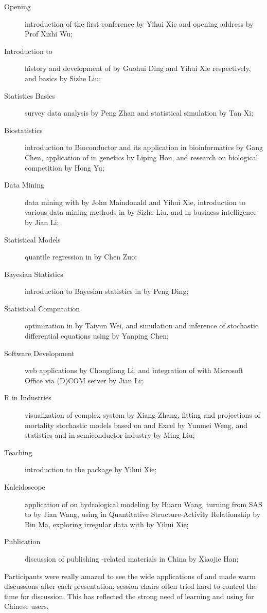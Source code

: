 \begin{description}
  \item[Opening] introduction of the first \R{} conference by Yihui
  Xie and opening address by Prof Xizhi Wu;
  \item[Introduction to \R{}] history and development of \R{} by Guohui Ding
  and Yihui Xie respectively, and \R{} basics by Sizhe Liu;
  \item[Statistics Basics] survey data analysis by Peng Zhan and
  statistical simulation by Tan Xi;
  \item[Biostatistics] introduction to Bioconductor and its application in bioinformatics
  by Gang Chen, application of \R{} in genetics by Liping Hou, and research on biological
  competition by Hong Yu;
  \item[Data Mining] data mining with \R{} by John Maindonald and
  Yihui Xie, introduction to various data mining methods in \R{} by
  Sizhe Liu, and \R{} in business intelligence by Jian Li;
  \item[Statistical Models] quantile regression in \R{} by Chen Zuo;
  \item[Bayesian Statistics] introduction to Bayesian statistics in
  \R{} by Peng Ding;
  \item[Statistical Computation] optimization in \R{} by Taiyun Wei,
  and simulation and inference of stochastic differential equations
  using \R{} by Yanping Chen;
  \item[Software Development] \R{} web applications by Chongliang
  Li, and integration of \R{} with Microsoft Office via \R{} (D)COM
  server by Jian Li;
  \item[R in Industries] visualization of complex system by Xiang
  Zhang, fitting and projections of mortality stochastic models
  based on \R{} and Excel by Yunmei Weng, and
  statistics and \R{} in semiconductor industry by Ming Liu;
  \item[Teaching] introduction to the \R{} package 
  by Yihui Xie;
  \item[Kaleidoscope] application of \R{} on hydrological modeling
  by Huaru Wang, turning from SAS to \R{} by Jian Wang, using \R{}
  in Quantitative Structure-Activity Relationship by Bin Ma,
  exploring irregular data with \R{} by Yihui Xie;
  \item[Publication] discussion of publishing \R{}-related materials
  in China by Xiaojie Han;
\end{description}

Participants were really amazed to see the wide applications of \R{}
and made warm discussions after each presentation; session chairs
often tried hard to control the time for discussion. This has
reflected the strong need of learning and using \R{} for Chinese
users.

